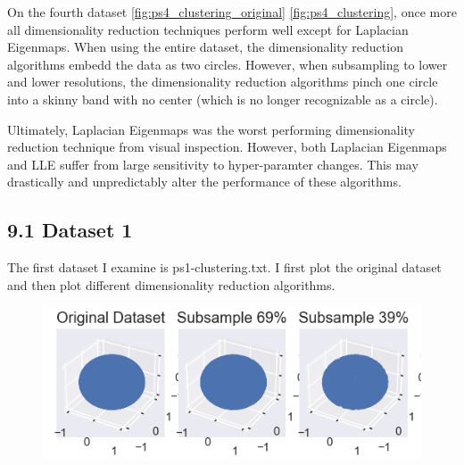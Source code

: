 \documentclass{article}
\begin{document}
        On the fourth dataset \ref{fig:ps4_clustering_original} \ref{fig:ps4_clustering}, once more all dimensionality reduction techniques perform well except for Laplacian Eigenmaps. When using the entire dataset, the dimensionality reduction algorithms embedd the data as two circles. However, when subsampling to lower and lower resolutions, the dimensionality reduction algorithms pinch one circle into a skinny band with no center (which is no longer recognizable as a circle).

        Ultimately, Laplacian Eigenmaps was the worst performing dimensionality reduction technique from visual inspection. However, both Laplacian Eigenmaps and LLE suffer from large sensitivity to hyper-paramter changes. This may drastically and unpredictably alter the performance of these algorithms. 

        \subsection*{9.1 Dataset 1}
            The first dataset I examine is ps1-clustering.txt. I first plot the original dataset and then plot different dimensionality reduction algorithms.
 
            \begin{figure}[h]
                \label{fig:ps1_clustering_original}
                \includegraphics[]{images/ps1-dataset1-original.png}
            \end{figure}
\end{document}
